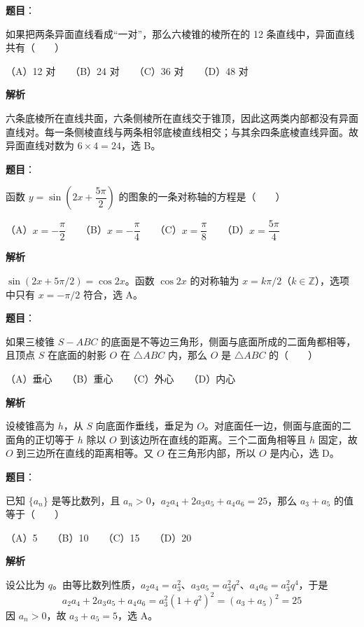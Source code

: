 \begin{answer}

\textbf{题目}：

如果把两条异面直线看成“一对”，那么六棱锥的棱所在的 12 条直线中，异面直线共有\mbox{（　　）}

（A）12 对　　（B）24 对　　（C）36 对　　（D）48 对

\textbf{解析}

六条底棱所在直线共面，六条侧棱所在直线交于锥顶，因此这两类内部都没有异面直线对。每一条侧棱直线与两条相邻底棱直线相交；与其余四条底棱直线异面。故异面直线对数为 $6\times4=24$，选 B。


\end{answer}
\begin{answer}

\textbf{题目}：

函数 $y=\sin\left(2x+\dfrac{5\pi}{2}\right)$ 的图象的一条对称轴的方程是\mbox{（　　）}

（A）$x=-\dfrac\pi2$　　（B）$x=-\dfrac\pi4$　　（C）$x=\dfrac\pi8$　　（D）$x=\dfrac{5\pi}4$

\textbf{解析}

$\sin(2x+5\pi/2)=\cos2x$。函数 $\cos2x$ 的对称轴为 $x=k\pi/2$（$k\in\mathbb Z$），选项中只有 $x=-\pi/2$ 符合，选 A。


\end{answer}
\begin{answer}

\textbf{题目}：

如果三棱锥 $S-ABC$ 的底面是不等边三角形，侧面与底面所成的二面角都相等，且顶点 $S$ 在底面的射影 $O$ 在 $\triangle ABC$ 内，那么 $O$ 是 $\triangle ABC$ 的\mbox{（　　）}

（A）垂心　　（B）重心　　（C）外心　　（D）内心

\textbf{解析}

设棱锥高为 $h$，从 $S$ 向底面作垂线，垂足为 $O$。对底面任一边，侧面与底面的二面角的正切等于 $h$ 除以 $O$ 到该边所在直线的距离。三个二面角相等且 $h$ 固定，故 $O$ 到三边所在直线的距离相等。又 $O$ 在三角形内部，所以 $O$ 是内心，选 D。


\end{answer}
\begin{answer}

\textbf{题目}：

已知 $\{a_n\}$ 是等比数列，且 $a_n>0$，$a_2a_4+2a_3a_5+a_4a_6=25$，那么 $a_3+a_5$ 的值等于\mbox{（　　）}

（A）5　　（B）10　　（C）15　　（D）20

\textbf{解析}

设公比为 $q$。由等比数列性质，$a_2a_4=a_3^2$、$a_3a_5=a_3^2q^2$、$a_4a_6=a_3^2q^4$，于是
\nopagebreak[4]
\[
a_2a_4+2a_3a_5+a_4a_6=a_3^2(1+q^2)^2=(a_3+a_5)^2=25
\]
因 $a_n>0$，故 $a_3+a_5=5$，选 A。


\end{answer}
